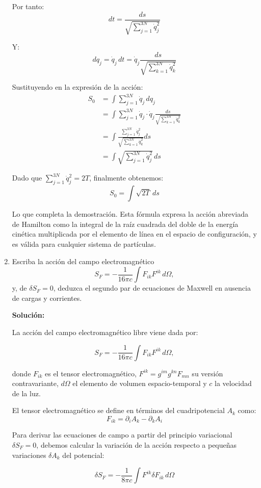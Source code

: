 \documentclass[12pt]{article}
\begin{document}
\begin{enumerate}
  Por tanto:
  \[
  dt = \frac{ds}{\sqrt{\sum_{j=1}^{3N}\dot{q}_j^2}}
  \]

  Y:
  \[
  dq_j = \dot{q}_j\,dt = \dot{q}_j\frac{ds}{\sqrt{\sum_{k=1}^{3N}\dot{q}_k^2}}
  \]

  Sustituyendo en la expresión de la acción:
  \begin{align}
  S_0 &= \int\sum_{j=1}^{3N}\dot{q}_j\,dq_j \\
  &= \int\sum_{j=1}^{3N}\dot{q}_j \cdot \dot{q}_j\frac{ds}{\sqrt{\sum_{k=1}^{3N}\dot{q}_k^2}} \\
  &= \int\frac{\sum_{j=1}^{3N}\dot{q}_j^2}{\sqrt{\sum_{k=1}^{3N}\dot{q}_k^2}}ds \\
  &= \int\sqrt{\sum_{j=1}^{3N}\dot{q}_j^2}\,ds
  \end{align}

  Dado que $\sum_{j=1}^{3N}\dot{q}_j^2 = 2T$, finalmente obtenemos:
  \[
  S_0 = \int\sqrt{2T}\,ds
  \]

  Lo que completa la demostración. Esta fórmula expresa la acción abreviada de Hamilton como la integral de la raíz cuadrada del doble de la energía cinética multiplicada por el elemento de línea en el espacio de configuración, y es válida para cualquier sistema de partículas.

  \item Escriba la acción del campo electromagnético
    \[
      S_F = -\frac{1}{16\pi c}\int F_{ik}F^{ik}\,d\Omega,
    \]
    y, de \(\delta S_F=0\), deduzca el segundo par de ecuaciones de Maxwell en ausencia de cargas y corrientes.

  \textbf{Solución:}

  La acción del campo electromagnético libre viene dada por:

  \[
  S_F = -\frac{1}{16\pi c}\int F_{ik}F^{ik}\,d\Omega,
  \]

  donde $F_{ik}$ es el tensor electromagnético, $F^{ik} = g^{im}g^{kn}F_{mn}$ su versión contravariante, $d\Omega$ el elemento de volumen espacio-temporal y $c$ la velocidad de la luz.

  El tensor electromagnético se define en términos del cuadripotencial $A_k$ como:
  \[
  F_{ik} = \partial_i A_k - \partial_k A_i
  \]

  Para derivar las ecuaciones de campo a partir del principio variacional $\delta S_F = 0$, debemos calcular la variación de la acción respecto a pequeñas variaciones $\delta A_k$ del potencial:

  \[
  \delta S_F = -\frac{1}{8\pi c}\int F^{ik}\delta F_{ik}\,d\Omega
  \]


\end{enumerate}
\end{document}
